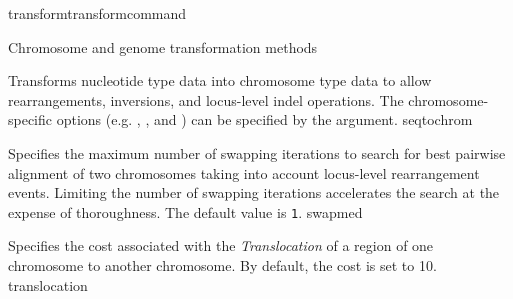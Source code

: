 \begin{command}{transform}{transformcommand}
\begin{arguments}
\begin{argumentgroup}{Chromosome and genome transformation methods}
\begin{description}
                        
%                         
          	 {Transforms nucleotide type data into chromosome type data to allow
           	 rearrangements, inversions, and locus-level indel operations.  The
            	chromosome-specific options (e.g.  , 
            	, %
		and ) can be specified by the argument.}
                	     {seqtochrom}
           
                        {Specifies the maximum number of swapping iterations
                        to search for best pairwise alignment of two chromosomes
                        taking into account locus-level rearrangement events. 
                        Limiting the number of swapping
                        iterations accelerates the search at the expense of
                        thoroughness. The default value is \texttt{1}.}
                        {swapmed}
                        
                        {Specifies the cost associated with the \emph{Translocation} of a region of one 
			chromosome to another chromosome.  By default, the cost is set to 10.}
			{translocation}
			
               \end{description}
        \end{argumentgroup}
        


\end{arguments}
\end{command}
